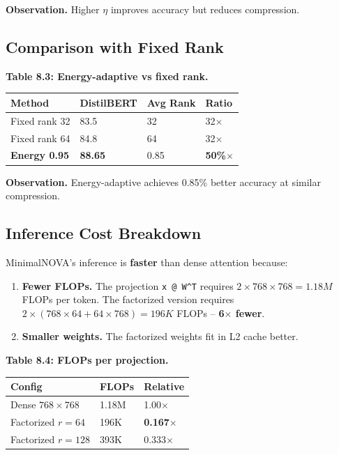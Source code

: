 \textbf{Observation.} Higher $\eta$ improves accuracy but reduces compression.

\subsection{Comparison with Fixed Rank}

\textbf{Table 8.3: Energy-adaptive vs fixed rank.}

\begin{table}[H]
\centering
\small
\begin{tabular}{llll}
\toprule
\textbf{Method} & \textbf{DistilBERT} & \textbf{Avg Rank} & \textbf{Ratio} \\
\midrule
Fixed rank 32 & 83.5 & 32 & 32$\times$ \\
Fixed rank 64 & 84.8 & 64 & 32$\times$ \\
\textbf{Energy 0.95} & \textbf{88.65} & 0.85 & \textbf{50\%$\times$} \\
\bottomrule
\end{tabular}
\end{table}

\textbf{Observation.} Energy-adaptive achieves 0.85\% better 
accuracy at similar compression.

\subsection{Inference Cost Breakdown}

MinimalNOVA's inference is \textbf{faster} than dense attention because:

\begin{enumerate}
\item \textbf{Fewer FLOPs.} The projection \texttt{x @ W^T} requires $2 \times 768 \times 768 = 1.18M$
  FLOPs per token. The factorized version requires $2 \times (768 \times 64 + 64 \times 768) = 196K$
  FLOPs -- \textbf{6$\times$ fewer}.
\item \textbf{Smaller weights.} The factorized weights fit in L2 cache better.

\end{enumerate}
\textbf{Table 8.4: FLOPs per projection.}

\begin{table}[H]
\centering
\small
\begin{tabular}{lll}
\toprule
\textbf{Config} & \textbf{FLOPs} & \textbf{Relative} \\
\midrule
Dense $768 \times 768$ & 1.18M & 1.00$\times$ \\
Factorized $r=64$ & 196K & \textbf{0.167$\times$} \\
Factorized $r=128$ & 393K & 0.333$\times$ \\
\bottomrule
\end{tabular}
\end{table}

